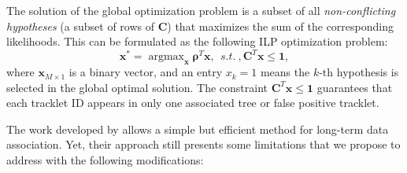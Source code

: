 \documentclass{article}
\begin{document}
The solution of the global optimization problem is a subset of all \textit{non-conflicting hypotheses} (a subset of rows of $\bm{C}$) that maximizes the sum of the corresponding likelihoods. This can be formulated as the following ILP optimization problem:
\begin{equation}
    \bm{x}^* = \mathop{\text{argmax}}_{\bm{x}} \bm{\rho} ^T \bm{x},~~s.t.~,\bm{C}^T \bm{x} \leq \bm{1},
    \label{eq:MAP}
\end{equation}
where ${\bm{x}_{M\times 1}}$ is a binary vector, and an entry $x_k=1$ means the ${k\text{-th}}$ hypothesis is selected in the global optimal solution. The constraint ${\bm{C}^T \bm{x} \leq \bm{1}}$ guarantees that each tracklet ID appears in only one associated tree or false positive tracklet.

The work developed by \cite{bise} allows a simple but efficient method for long-term data association. Yet, their approach still presents some limitations that we propose to address with the following modifications:
\end{document}
